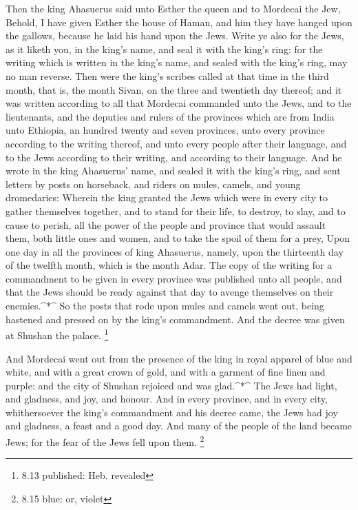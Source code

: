  Then the king Ahasuerus said unto Esther the queen and to
Mordecai the Jew, Behold, I have given Esther the house of Haman, and
him they have hanged upon the gallows, because he laid his hand upon the
Jews.  Write ye also for the Jews, as it liketh you, in the
king's name, and seal it with the king's ring: for the writing which is
written in the king's name, and sealed with the king's ring, may no man
reverse.  Then were the king's scribes called at that time
in the third month, that is, the month Sivan, on the three and twentieth
day thereof; and it was written according to all that Mordecai commanded
unto the Jews, and to the lieutenants, and the deputies and rulers of
the provinces which are from India unto Ethiopia, an hundred twenty and
seven provinces, unto every province according to the writing thereof,
and unto every people after their language, and to the Jews according to
their writing, and according to their language.  And he
wrote in the king Ahasuerus' name, and sealed it with the king's ring,
and sent letters by posts on horseback, and riders on mules, camels, and
young dromedaries:  Wherein the king granted the Jews which
were in every city to gather themselves together, and to stand for their
life, to destroy, to slay, and to cause to perish, all the power of the
people and province that would assault them, both little ones and women,
and to take the spoil of them for a prey,  Upon one day in
all the provinces of king Ahasuerus, namely, upon the thirteenth day of
the twelfth month, which is the month Adar.  The copy of
the writing for a commandment to be given in every province was
published unto all people, and that the Jews should be ready against
that day to avenge themselves on their enemies.\^{}*\^{} 
So the posts that rode upon mules and camels went out, being hastened
and pressed on by the king's commandment. And the decree was given at
Shushan the palace. \footnote{8.13 published: Heb. revealed}

 And Mordecai went out from the presence of the king in
royal apparel of blue and white, and with a great crown of gold, and
with a garment of fine linen and purple: and the city of Shushan
rejoiced and was glad.\^{}*\^{}  The Jews had light, and
gladness, and joy, and honour.  And in every province, and
in every city, whithersoever the king's commandment and his decree came,
the Jews had joy and gladness, a feast and a good day. And many of the
people of the land became Jews; for the fear of the Jews fell upon them.
\footnote{8.15 blue: or, violet}

